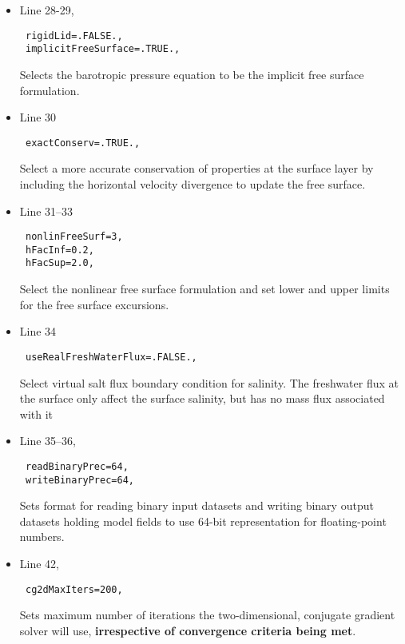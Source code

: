 {\begin{itemize}
\item Line 28-29,
\begin{verbatim}
 rigidLid=.FALSE., 
 implicitFreeSurface=.TRUE., 
\end{verbatim}
  Selects the barotropic pressure equation to be the implicit free
  surface formulation.
\item Line 30
\begin{verbatim}
 exactConserv=.TRUE.,
\end{verbatim}
  Select a more accurate conservation of properties at the surface
  layer by including the horizontal velocity divergence to update the
  free surface.
\item Line 31--33
\begin{verbatim}
 nonlinFreeSurf=3,
 hFacInf=0.2,
 hFacSup=2.0,
\end{verbatim}
  Select the nonlinear free surface formulation and set lower and
  upper limits for the free surface excursions.
\item Line 34
\begin{verbatim}
 useRealFreshWaterFlux=.FALSE.,
\end{verbatim}
  Select virtual salt flux boundary condition for salinity. The
  freshwater flux at the surface only affect the surface salinity, but 
  has no mass flux associated with it

\item Line 35--36,
\begin{verbatim}
 readBinaryPrec=64,
 writeBinaryPrec=64,
\end{verbatim}
  Sets format for reading binary input datasets and 
  writing binary output datasets holding model fields to
  use 64-bit representation for floating-point numbers.\\

\item Line 42,
\begin{verbatim}
 cg2dMaxIters=200,
\end{verbatim}
  Sets maximum number of iterations the two-dimensional, conjugate
  gradient solver will use, {\bf irrespective of convergence 
    criteria being met}.\\


\end{itemize}}
